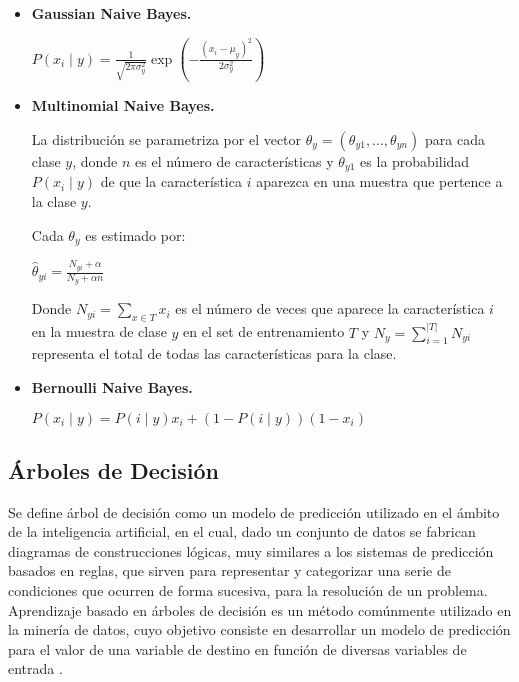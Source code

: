 \begin{itemize}
	
	\item \textbf{Gaussian Naive Bayes.}
	
	\begin{center}
		$P(x_i \mid y) = \frac{1}{\sqrt{2\pi\sigma^2_y}} \exp\left(-\frac{(x_i - \mu_y)^2}{2\sigma^2_y}\right)$
	\end{center}
	
	\item \textbf{Multinomial Naive Bayes.}
	
	La distribución se parametriza por el vector $\theta_y = (\theta_{y1},\ldots,\theta_{yn})$ para cada clase $y$, donde $n$ es el número de características y $\theta_{y1}$ es la probabilidad $P(x_i \mid y)$ de que la característica $i$ aparezca en una muestra que pertence a la clase $y$.
	
	Cada $\theta_y$ es estimado por:
	
	\begin{center}
		
		$\hat{\theta}_{yi} = \frac{ N_{yi} + \alpha}{N_y + \alpha n}$		
	\end{center}
	
	Donde $N_{yi} = \sum_{x \in T} x_i$ es el número  de veces que aparece la característica $i$ en la muestra de clase $y$ en el set de entrenamiento $T$ y $N_{y} = \sum_{i=1}^{|T|} N_{yi}$ representa el total de todas las características para la clase.
	
	\item \textbf{Bernoulli Naive Bayes.}
	
	\begin{center}
		$P(x_i \mid y) = P(i \mid y) x_i + (1 - P(i \mid y)) (1 - x_i)$
	\end{center}
	
\end{itemize}

\subsection{Árboles de Decisión}

Se define árbol de  decisión como un modelo de predicción utilizado en el ámbito de la inteligencia artificial, en el cual,  dado un conjunto de datos se fabrican diagramas de construcciones lógicas, muy similares a los sistemas de predicción basados en reglas, que sirven para representar y categorizar una serie de condiciones que ocurren de forma sucesiva, para la resolución de un problema.  Aprendizaje basado en árboles de decisión es un método comúnmente utilizado en la minería de datos, cuyo objetivo consiste en desarrollar un modelo de predicción para el valor de una variable de destino en función de diversas variables de entrada \cite{freund1999alternating}.


